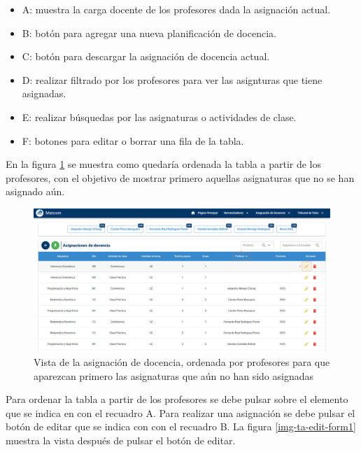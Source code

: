 \begin{itemize}
    \item A: muestra la carga docente de los profesores dada la asignación actual.
    \item B: botón para agregar una nueva planificación de docencia.
    \item C: botón para descargar la asignación de docencia actual.
    \item D: realizar filtrado por los profesores para ver las asignturas que tiene asignadas.
    \item E: realizar búsquedas por las asignaturas o actividades de clase.
    \item F: botones para editar o borrar una fila de la tabla.  
\end{itemize}



En la figura \ref{img-ta-ordering} se muestra como quedaría ordenada la tabla a partir de los profesores,
con el objetivo de mostrar primero aquellas 
asignaturas que no se han asignado aún.


\begin{figure}[H]
    \includegraphics[scale=0.3]{Graphics/Implementation/Docencia/AD-sin-asignar.png}
    \caption{Vista de la asignación de docencia, ordenada por profesores para que aparezcan primero las asignaturas que aún no han sido asignadas}
    \label{img-ta-ordering}
\end{figure}


Para ordenar la tabla a partir de los profesores se debe pulsar sobre el elemento que se indica en 
con el recuadro A. Para realizar una asignación se debe pulsar el botón de editar que se indica con
con el recuadro B. La figura \ref{img-ta-edit-form1} muestra la vista después de pulsar el botón de 
editar.  



